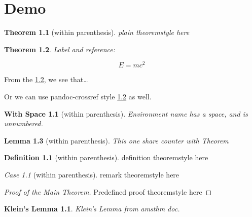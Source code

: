 \theoremstyle{plain}
\newtheorem{Theorem}{Theorem}[section]
\newtheorem{Lemma}[Theorem]{Lemma}
\newtheorem{Corollary}[Theorem]{Corollary}
\newtheorem*{With Space}{With Space}
\newtheorem{Proposition}{Proposition}[section]
\newtheorem{Conjecture}[Proposition]{Conjecture}
\newtheorem{WithoutSpace}{WithoutSpace}[section]
\newtheorem{KL}{Klein’s Lemma}[section]
\theoremstyle{definition}
\newtheorem{Definition}{Definition}[section]
\theoremstyle{remark}
\newtheorem{Case}{Case}[section]

\hypertarget{demo}{%
\chapter{Demo}\label{demo}}

\begin{Theorem}[within parenthesis]
plain theoremstyle \emph{here}
\end{Theorem}

\begin{Theorem}\label{simplestEquation}
\leavevmode{}%
Label and reference:

\[E=mc^2\]
\end{Theorem}

From the \ref{simplestEquation}, we see that\ldots{}

Or we can use pandoc-crossref style \ref{simplestEquation} as well.

\begin{With Space}[within parenthesis]
Environment name has a space, and is unnumbered.
\end{With Space}

\begin{Lemma}[within parenthesis]
This one share counter with Theorem
\end{Lemma}

\begin{Definition}[within parenthesis]
definition theoremstyle here
\end{Definition}

\begin{Case}[within parenthesis]
remark theoremstyle here
\end{Case}

\begin{proof}[Proof of the Main Theorem]
Predefined proof theoremstyle here
\end{proof}

\begin{KL}
Klein's Lemma from amsthm doc.
\end{KL}

